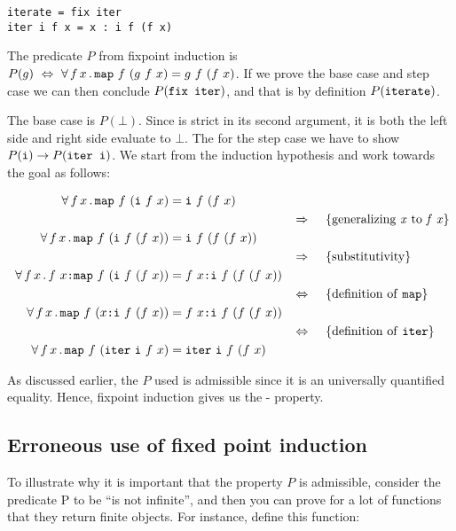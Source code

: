 \begin{verbatim}
iterate = fix iter
iter i f x = x : i f (f x)
\end{verbatim}

The predicate $P$ from fixpoint induction is $P(g) \w \Leftrightarrow
\w \faa{f}{x} \hs{map} \w f \w (g \w f \w x) \eq g \w f \w (f \w x) $. If we
prove the base case and step case we can then conclude
$P(\hs{fix iter})$, and that is by definition $P(\hs{iterate})$.

The base case is $P(\bot)$. Since  is strict in its second
argument, it is both the left side and right side evaluate to $\bot$.
The for the step case we have to show
$P(\hs{i}) \rightarrow P(\hs{iter i})$. We start from the induction
hypothesis and work towards the goal as follows:

\begin{align*}
\w \faa{f}{x} \hs{map} \w f \w (\hs{i} \w f \w x) & \eq \hs{i} \w f \w (f \w x) \\
\descra{generalizing \w \mathit{x} \w to \w \mathit{f \w x}} \\
\w \faa{f}{x} \hs{map} \w f \w (\hs{i} \w f \w (f \w x)) & \eq \hs{i} \w f \w (f \w (f \w x)) \\
\descra{substitutivity} \\
\w \faa{f}{x} f \w x \hs{:} \hs{map} \w f \w (\hs{i} \w f \w (f \w x)) & \eq f \w x \hs{:} \hs{i} \w f \w (f \w (f \w x)) \\
\desclra{definition \w of \w \hs{map}} \\
\w \faa{f}{x} \hs{map} \w f \w (x \hs{:} \hs{i} \w f \w (f \w x)) & \eq f \w x \hs{:} \hs{i} \w f \w (f \w (f \w x)) \\
\desclra{definition \w of \w \hs{iter}} \\
\w \faa{f}{x} \hs{map} \w f \w (\hs{iter} \w \hs{i} \w f \w x) & \eq \hs{iter} \w \hs{i} \w f \w (f \w x) \\
\end{align*}

As discussed earlier, the $P$ used is admissible since it is an
universally quantified equality. Hence, fixpoint induction gives us the
- property.

\subsection{Erroneous use of fixed point induction}

To illustrate why it is important that the property $P$ is admissible,
consider the predicate P to be “is not infinite”, and then you can
prove for a lot of functions that they return finite objects. For
instance, define this function:

